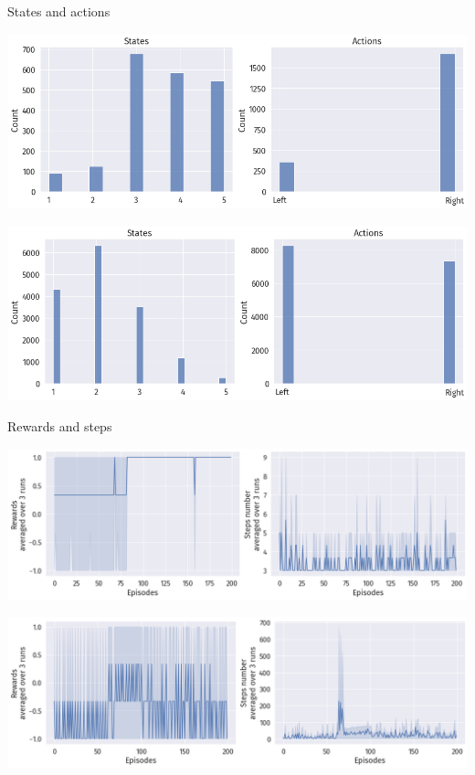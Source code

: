 \documentclass[bigger]{beamer}
\begin{document}
\begin{frame}[label={sec:org8b4cbe2}]{States and actions}
\begin{center}
\includegraphics[width=.9\linewidth]{img/DRL-states-actions.png}
\end{center}
\begin{center}
\includegraphics[width=.9\linewidth]{img/DRL-states-actions2.png}
\end{center}
\end{frame}
\begin{frame}[label={sec:org9b282e5}]{Rewards and steps}
\begin{center}
\includegraphics[width=.9\linewidth]{img/DRL-rewards-steps.png}
\end{center}
\begin{center}
\includegraphics[width=.9\linewidth]{img/DRL-rewards-steps2.png}
\end{center}
\end{frame}
\end{document}
